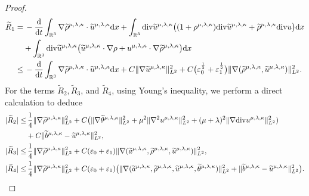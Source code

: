 \documentclass[reqno,11pt]{amsart}
\theoremstyle{plain}
\numberwithin{equation}{section}
\newcommand{\eps}{{\varepsilon}}
\begin{document}
\begin{proof}
\begin{align}\label{G4.38}
\widetilde{R}_1 =&\,-\frac{\mathrm{d}}{\mathrm{d} t} \int_{\mathbb{R}^3} \nabla    \widetilde{\rho}^{\mu,\lambda,\kappa} \cdot \widetilde{u}^{\mu,\lambda,\kappa} \mathrm{d} x+\int_{\mathbb{R}^3}  {\rm div}   \widetilde{u}^{\mu,\lambda,\kappa} \big ( (1+ {\rho}^{\mu,\lambda,\kappa}) {\rm div} \widetilde{u}^{\mu,\lambda,\kappa}+\widetilde{\rho}^{\mu,\lambda,\kappa}{\rm div}u \big) \mathrm{d} x \nonumber\\   
&+\int_{\mathbb{R}^3}  {\rm div}   \widetilde{u}^{\mu,\lambda,\kappa} \big (  \widetilde{u}^{\mu,\lambda,\kappa} \cdot \nabla \rho+u^{\mu,\lambda,\kappa}\cdot\nabla\widetilde{\rho}^{\mu,\lambda,\kappa}\big) \mathrm{d} x \nonumber\\  
\leq &\,-\frac{\mathrm{d}}{\mathrm{d} t} \int_{\mathbb{R}^3} \nabla    \widetilde{\rho}^{\mu,\lambda,\kappa} \cdot \widetilde{u}^{\mu,\lambda,\kappa} \mathrm{d} x+C\|\nabla\widetilde{u}^{\mu,\lambda,\kappa}\|_{L^2}^2+C\big(\eps_0^\frac{1}{2}+\eps_1^\frac{1}{2}\big)
\|\nabla(\widetilde{\rho}^{\mu,\lambda,\kappa},\widetilde{u}^{\mu,\lambda,\kappa})\|_{L^2}^2.
\end{align}
For the terms $\widetilde{R}_2, \widetilde{R}_3$, and $\widetilde{R}_4$, using Young's inequality, we perform a direct calculation to deduce  
\begin{align}
|\widetilde{R}_2 |  \leq&\, \frac{1}{4}\|\nabla\widetilde{\rho}^{\mu,\lambda,\kappa}\|_{L^2}^2+C\big(\|\nabla\widetilde{\theta}^{\mu,\lambda,\kappa}\|_{L^2}^2+ \mu^2\|\nabla^2{u}^{\mu,\lambda,\kappa}\|_{L^2}^2+(\mu+\lambda)^2\|\nabla{\rm div}u^{\mu,\lambda,\kappa}\|_{L^2}^2)\nonumber\\
&+C\|\widetilde{b}^{\mu,\lambda,\kappa}-\widetilde{u}^{\mu,\lambda,\kappa}\|_{L^2}^2,\label{G4.39-1}\\
|\widetilde{R}_3 |  \leq&\, \frac{1}{4}\|\nabla\widetilde{\rho}^{\mu,\lambda,\kappa}\|_{L^2}^2+C(\eps_0+\eps_1)\|\nabla (\widetilde{a}^{\mu,\lambda,\kappa},\widetilde{\rho}^{\mu,\lambda,\kappa},\widetilde{u}^{\mu,\lambda,\kappa})\|_{L^2}^2,\label{G4.39-2}\\
|\widetilde{R}_4 |\leq&\,  \frac{1}{4}\|\nabla\widetilde{\rho}^{\mu,\lambda,\kappa}\|_{L^2}^2+C(\eps_0+\eps_1)\big(\|\nabla (\widetilde{a}^{\mu,\lambda,\kappa},\widetilde{\rho}^{\mu,\lambda,\kappa}, \widetilde{u}^{\mu,\lambda,\kappa},\widetilde\theta^{\mu,\lambda,\kappa})\|_{L^2}^2+\|\widetilde{b}^{\mu,\lambda,\kappa}-\widetilde{u}^{\mu,\lambda,\kappa}\|_{L^2}^2 \big).\label{G4.39}
\end{align} 

\end{proof}
\end{document}

